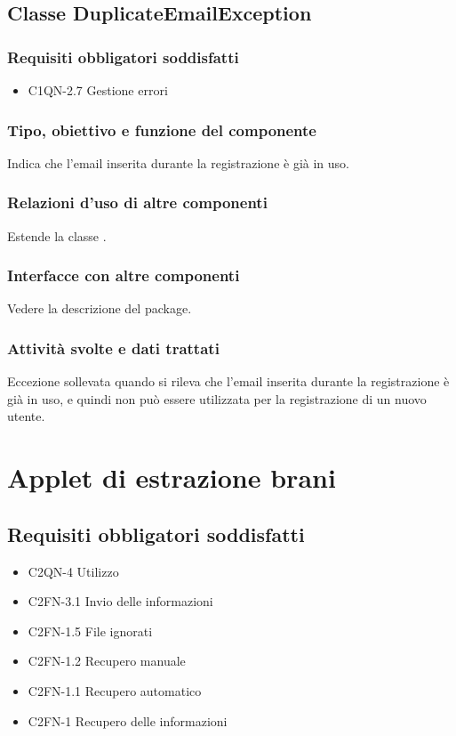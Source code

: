 \subsection{Classe DuplicateEmailException}
\subsubsection*{Requisiti obbligatori soddisfatti}
\begin{itemize}
	\item C1QN-2.7 Gestione errori
\end{itemize}
\subsubsection*{Tipo, obiettivo e funzione del componente}
Indica che l'email inserita durante la registrazione \`e gi\`a in uso.
\subsubsection*{Relazioni d'uso di altre componenti}
Estende la classe .
\subsubsection*{Interfacce con altre componenti}
Vedere la descrizione del package.
\subsubsection*{Attivit\`a svolte e dati trattati}
Eccezione sollevata quando si rileva che l'email inserita durante la
registrazione \`e gi\`a in uso, e quindi non pu\`o essere utilizzata per la
registrazione di un nuovo utente.

\newpage
\section{Applet di estrazione brani}
\subsection*{Requisiti obbligatori soddisfatti}
\begin{itemize}
	\item C2QN-4 Utilizzo
	\item C2FN-3.1 Invio delle informazioni
	\item C2FN-1.5 File ignorati
	\item C2FN-1.2 Recupero manuale
	\item C2FN-1.1 Recupero automatico
	\item C2FN-1 Recupero delle informazioni
\end{itemize}

